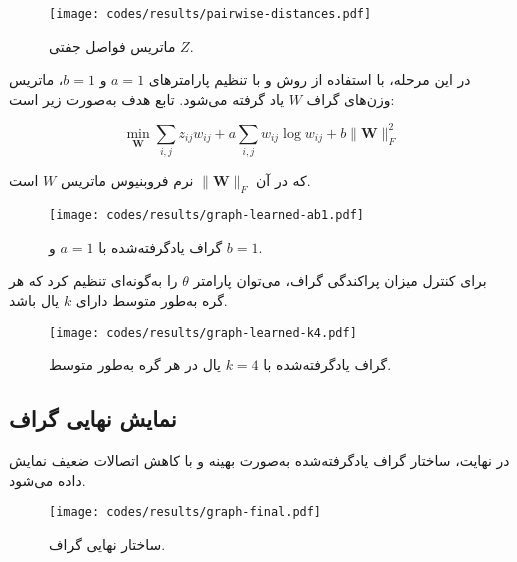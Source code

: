 \documentclass[10pt,twocolumn,a4paper]{article}
\begin{document}
	\begin{latin}
		
	\end{latin}
	
	
	\begin{figure}[H]
		\centering
		\texttt{[image: codes/results/pairwise-distances.pdf]}
		\caption{ماتریس فواصل جفتی \( Z \).}
		\label{fig:pairwise-distances}
	\end{figure}
	

	در این مرحله، با استفاده از روش \cite{Kalofolias2016} و با تنظیم پارامترهای \( a = 1 \) و \( b = 1 \)، ماتریس وزن‌های گراف \( W \) یاد گرفته می‌شود. تابع هدف به‌صورت زیر است:
	
	\[
	\min_{\bm{W}} \sum_{i,j} z_{ij} w_{ij} + a \sum_{i,j} {w}_{ij} \log {w}_{ij} + b \|\bm{W}\|_F^2
	\]
	
	که در آن
	\( \|\bm{W}\|_F \)
	نرم فروبنیوس ماتریس \( W \) است.
	
	\begin{latin}
		
	\end{latin}
	
	\begin{figure}[H]
		\centering
		\texttt{[image: codes/results/graph-learned-ab1.pdf]}
		\caption{گراف یادگرفته‌شده با \( a = 1 \) و \( b = 1 \).}
		\label{fig:graph-learned-ab1}
	\end{figure}
	
	برای کنترل میزان پراکندگی گراف، می‌توان پارامتر \( \theta \) را به‌گونه‌ای تنظیم کرد که هر گره به‌طور متوسط دارای \( k \) یال باشد. 
	
	\begin{latin}
		
	\end{latin}
	
	
	\begin{figure}[H]
		\centering
		\texttt{[image: codes/results/graph-learned-k4.pdf]}
		\caption{گراف یادگرفته‌شده با \( k = 4 \) یال در هر گره به‌طور متوسط.}
		\label{fig:graph-learned-k4}
	\end{figure}
	
	\subsection{نمایش نهایی گراف}
	در نهایت، ساختار گراف یادگرفته‌شده به‌صورت بهینه و با کاهش اتصالات ضعیف نمایش داده می‌شود.
	
	\begin{latin}
		
	\end{latin}
	
	
	\begin{figure}[H]
		\centering
		\texttt{[image: codes/results/graph-final.pdf]}
		\caption{ساختار نهایی گراف.}
		\label{fig:graph-final}
	\end{figure}
	
	
	
	
	
\end{document}

